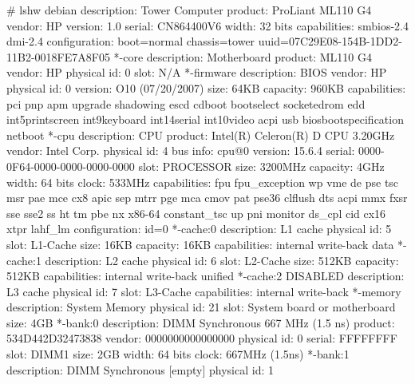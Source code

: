 \documentclass[mingoth,a4paper]{jsarticle}
\begin{document}
{{{{{{{{{{{{{{\begin{commandline}
# lshw 
debian
    description: Tower Computer
    product: ProLiant ML110 G4
    vendor: HP
    version: 1.0
    serial: CN864400V6
    width: 32 bits
    capabilities: smbios-2.4 dmi-2.4
    configuration: boot=normal chassis=tower uuid=07C29E08-154B-1DD2-11B2-0018FE7A8F05
  *-core
       description: Motherboard
       product: ML110 G4
       vendor: HP
       physical id: 0
       slot: N/A
     *-firmware
          description: BIOS
          vendor: HP
          physical id: 0
          version: O10 (07/20/2007)
          size: 64KB
          capacity: 960KB
          capabilities: pci pnp apm upgrade shadowing escd cdboot bootselect socketedrom edd int5printscreen int9keyboard int14serial int10video acpi usb biosbootspecification netboot
     *-cpu
          description: CPU
          product: Intel(R) Celeron(R) D CPU 3.20GHz
          vendor: Intel Corp.
          physical id: 4
          bus info: cpu@0
          version: 15.6.4
          serial: 0000-0F64-0000-0000-0000-0000
          slot: PROCESSOR
          size: 3200MHz
          capacity: 4GHz
          width: 64 bits
          clock: 533MHz
          capabilities: fpu fpu_exception wp vme de pse tsc msr pae mce cx8 apic sep mtrr pge mca cmov pat pse36 clflush dts acpi mmx fxsr sse sse2 ss ht tm pbe nx x86-64 constant_tsc up pni monitor ds_cpl cid cx16 xtpr lahf_lm
          configuration: id=0
        *-cache:0
             description: L1 cache
             physical id: 5
             slot: L1-Cache
             size: 16KB
             capacity: 16KB
             capabilities: internal write-back data
        *-cache:1
             description: L2 cache
             physical id: 6
             slot: L2-Cache
             size: 512KB
             capacity: 512KB
             capabilities: internal write-back unified
        *-cache:2 DISABLED
             description: L3 cache
             physical id: 7
             slot: L3-Cache
             capabilities: internal write-back
     *-memory
          description: System Memory
          physical id: 21
          slot: System board or motherboard
          size: 4GB
        *-bank:0
             description: DIMM Synchronous 667 MHz (1.5 ns)
             product: 534D442D32473838
             vendor: 0000000000000000
             physical id: 0
             serial: FFFFFFFF
             slot: DIMM1
             size: 2GB
             width: 64 bits
             clock: 667MHz (1.5ns)
        *-bank:1
             description: DIMM Synchronous [empty]
             physical id: 1

\end{commandline}}}}}}}}}}}}}}}
\end{document}
